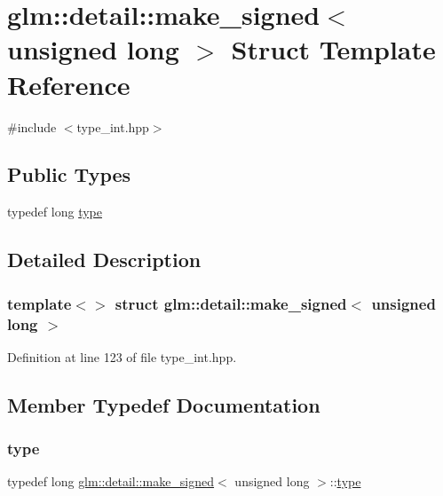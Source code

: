 \hypertarget{structglm_1_1detail_1_1make__signed_3_01unsigned_01long_01_4}{}\section{glm\+::detail\+::make\+\_\+signed$<$ unsigned long $>$ Struct Template Reference}
\label{structglm_1_1detail_1_1make__signed_3_01unsigned_01long_01_4}


{\ttfamily \#include $<$type\+\_\+int.\+hpp$>$}

\subsection*{Public Types}
\begin{DoxyCompactItemize}
\item 
typedef long \mbox{\hyperlink{structglm_1_1detail_1_1make__signed_3_01unsigned_01long_01_4_a055abdf7ba75d133a9784c2749f2336f}{type}}
\end{DoxyCompactItemize}


\subsection{Detailed Description}
\subsubsection*{template$<$$>$\newline
struct glm\+::detail\+::make\+\_\+signed$<$ unsigned long $>$}



Definition at line 123 of file type\+\_\+int.\+hpp.



\subsection{Member Typedef Documentation}
\mbox{\label{structglm_1_1detail_1_1make__signed_3_01unsigned_01long_01_4_a055abdf7ba75d133a9784c2749f2336f}} 
\subsubsection{\texorpdfstring{type}{type}}
{\footnotesize\ttfamily typedef long \mbox{\hyperlink{structglm_1_1detail_1_1make__signed}{glm\+::detail\+::make\+\_\+signed}}$<$ unsigned long $>$\+::\mbox{\hyperlink{structglm_1_1detail_1_1make__signed_3_01unsigned_01long_01_4_a055abdf7ba75d133a9784c2749f2336f}{type}}}



